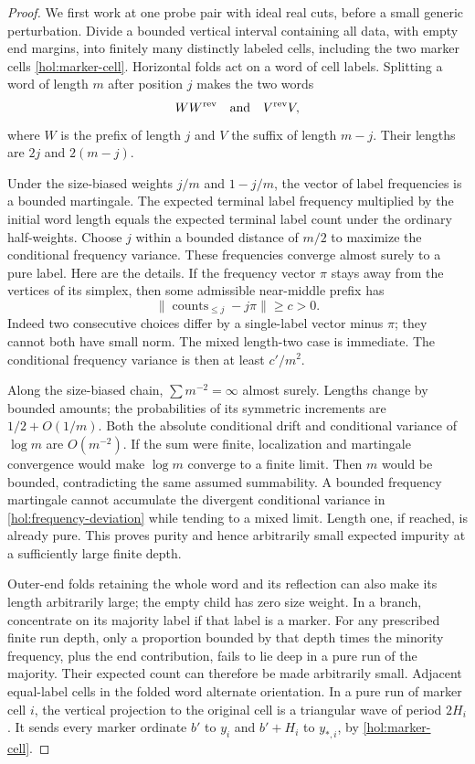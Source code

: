\begin{proof}
We first work at one probe pair with ideal real cuts, before a small
generic perturbation.  Divide a bounded vertical interval containing
all data, with empty end margins, into finitely many distinctly labeled
cells, including the two marker cells \eqref{hol:marker-cell}.
Horizontal folds act on a word of cell labels.  Splitting a word of
length $m$ after position $j$ makes the two words
\begin{equation}
 WW^{\rm rev}\quad\text{and}\quad V^{\rm rev}V,
 \label{hol:word-split}
\end{equation}
where $W$ is the prefix of length $j$ and $V$ the suffix of length
$m-j$.  Their lengths are $2j$ and $2(m-j)$.

Under the size-biased weights $j/m$ and $1-j/m$, the vector of label
frequencies is a bounded martingale.  The expected terminal label
frequency multiplied by the initial word length equals the expected
terminal label count under the ordinary half-weights.  Choose $j$
within a bounded distance of $m/2$ to maximize the conditional frequency
variance.  These frequencies converge almost surely to a pure label.
Here are the details.  If the frequency vector $\pi$ stays away from
the vertices of its simplex, then some admissible near-middle prefix
has
\begin{equation}
 \|\operatorname{counts}_{\le j}-j\pi\|\ge c>0.
 \label{hol:frequency-deviation}
\end{equation}
Indeed two consecutive choices differ by a single-label vector minus
$\pi$; they cannot both have small norm.  The mixed length-two case
is immediate.  The conditional frequency variance is then at least
$c'/m^2$.

Along the size-biased chain, $\sum m^{-2}=\infty$ almost surely.
Lengths change by bounded amounts; the probabilities of its symmetric
increments are $1/2+O(1/m)$.  Both the absolute conditional drift and
conditional variance of $\log m$ are $O(m^{-2})$.  If the sum were
finite, localization and martingale convergence would make $\log m$
converge to a finite limit.  Then $m$ would be bounded, contradicting
the same assumed summability.  A bounded frequency martingale cannot
accumulate the divergent conditional variance in
\eqref{hol:frequency-deviation} while tending to a mixed limit.
Length one, if reached, is already pure.  This proves purity and hence
arbitrarily small expected impurity at a sufficiently large finite depth.

Outer-end folds retaining the whole word and its reflection can also
make its length arbitrarily large; the empty child has zero size weight.
In a branch, concentrate on its majority label if that label is a
marker.  For any prescribed finite run depth, only a proportion bounded
by that depth times the minority frequency, plus the end contribution,
fails to lie deep in a pure run of the majority.  Their expected count
can therefore be made arbitrarily small.  Adjacent equal-label cells
in the folded word alternate orientation.  In a pure run of marker
cell $i$, the vertical projection to the original cell is a triangular
wave of period $2H_i$.  It sends every marker ordinate $b'$ to $y_i$
and $b'+H_i$ to $y_{*,i}$, by \eqref{hol:marker-cell}.


\end{proof}
